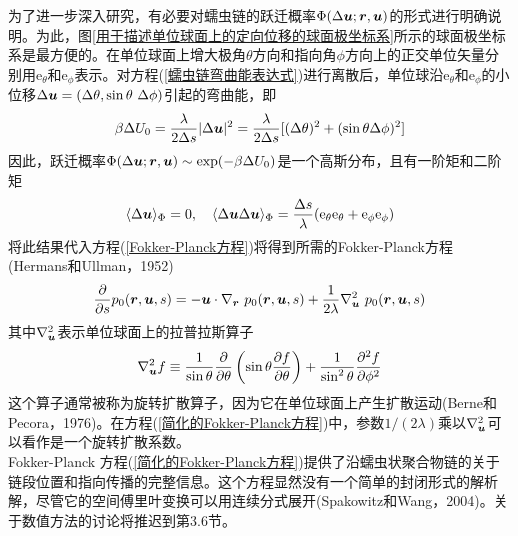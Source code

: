 为了进一步深入研究，有必要对蠕虫链的跃迁概率$\Phi(\Delta \bm{u};\bm{r},\bm{u})$的形式进行明确说明。为此，图\ref{用于描述单位球面上的定向位移的球面极坐标系}所示的球面极坐标系是最方便的。在单位球面上增大极角$\theta$方向和指向角$\phi$方向上的正交单位矢量分别用$\mathrm{e}_\theta$和$\mathrm{e}_\phi$表示。对方程(\ref{蠕虫链弯曲能表达式})进行离散后，单位球沿$\mathrm{e}_\theta$和$\mathrm{e}_\phi$的小位移$\Delta \bm{u}=(\Delta \theta ,\sin \theta \ \Delta \phi)$引起的弯曲能，即\\
\begin{equation}
\beta\Delta U_0 =\frac{\lambda}{2\Delta s}|\Delta \bm{u}|^2 =\frac{\lambda}{2\Delta s}[(\Delta\theta)^2+(\sin \theta \Delta \phi)^2]
\end{equation}
因此，跃迁概率$\Phi(\Delta \bm{u};\bm{r},\bm{u})\sim 
\exp(-\beta \Delta U_0)$是一个高斯分布，且有一阶矩和二阶矩\\
\begin{equation}
\langle \Delta \bm{u}\rangle_\Phi =0,\quad \langle \Delta \bm{u}\Delta \bm{u}\rangle_\Phi =\frac{\Delta s}{\lambda}(\mathrm{e}_\theta \mathrm{e}_\theta+\mathrm{e}_\phi \mathrm{e}_\phi)
\end{equation}
将此结果代入方程(\ref{Fokker-Planck方程})将得到所需的Fokker-Planck方程(Hermans和Ullman，1952)\\
\begin{equation}
	\frac{\partial}{\partial s}p_0(\br,\bu,s) =-\bu \cdot \nabla_{\br} \ p_0(\br,\bu,s)+\frac{1}{2\lambda}\nabla_{\bu}^2\  p_0(\br,\bu,s)\label{简化的Fokker-Planck方程}
\end{equation}
其中$\nabla_{\bm{u}}^2$表示单位球面上的拉普拉斯算子\\
\begin{equation}
\nabla_{\bm{u}}^2 f \equiv \frac{1}{\sin\theta}\frac{\partial}{\partial\theta}\left(\sin\theta \frac{\partial f}{\partial \theta}\right)+\frac{1}{\sin^2\theta}\frac{\partial^2f}{\partial\phi^2}
\end{equation}
这个算子通常被称为旋转扩散算子，因为它在单位球面上产生扩散运动(Berne和Pecora，1976)。在方程(\ref{简化的Fokker-Planck方程})中，参数$1/(2\lambda)$乘以$\nabla_{\bm{u}}^2$可以看作是一个旋转扩散系数。\\

Fokker-Planck 方程(\ref{简化的Fokker-Planck方程})提供了沿蠕虫状聚合物链的关于链段位置和指向传播的完整信息。这个方程显然没有一个简单的封闭形式的解析解，尽管它的空间傅里叶变换可以用连续分式展开(Spakowitz和Wang，2004)。关于数值方法的讨论将推迟到第3.6节。\\

